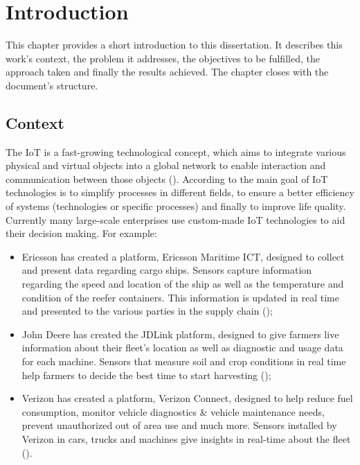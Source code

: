 \chapter{Introduction}
\label{chap:introduction}

This chapter provides a short introduction to this dissertation. It describes this work's context, the problem it addresses, the objectives to be fulfilled, the approach taken and finally the results achieved. The chapter closes with the document's structure.

\section{Context}
\label{sec:introduction:context}

The \gls{IoT} is a fast-growing technological concept, which aims to integrate various physical and virtual objects into a global network to enable interaction and communication between those objects (\cite{Atzori2010TheIO}). According to \cite{NIZETIC2020122877} the main goal of \gls{IoT} technologies is to simplify processes in different fields, to ensure a better efficiency of systems (technologies or specific processes) and finally to improve life quality.
Currently many large-scale enterprises use custom-made \gls{IoT} technologies to aid their decision making. For example:
\begin{itemize}
    \item Ericsson has created a platform, Ericsson Maritime ICT, designed to collect and present data regarding cargo ships. Sensors capture information regarding the speed and location of the ship as well as the temperature and condition of the reefer containers. This information is updated in real time and presented to the various parties in the supply chain (\cite{ericson-marinetime});
    \item John Deere has created the JDLink platform, designed to give farmers live information about their fleet's location as well as diagnostic and usage data for each machine. Sensors that measure soil and crop conditions in real time help farmers to decide the best time to start harvesting (\cite{jdlink});
    \item Verizon has created a platform, Verizon Connect, designed to help reduce fuel consumption, monitor vehicle diagnostics \& vehicle maintenance needs, prevent unauthorized out of area use and much more. Sensors installed by Verizon in cars, trucks and machines give insights in real-time about the fleet (\cite{verizon-iot}).
\end{itemize}

